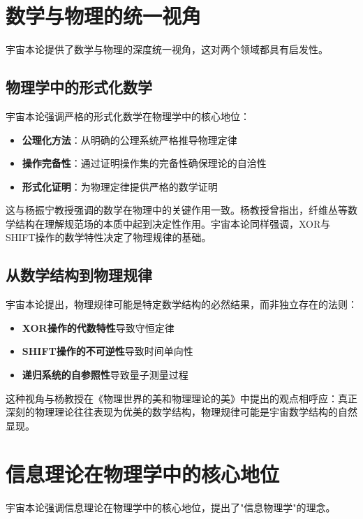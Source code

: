 \section{数学与物理的统一视角}

宇宙本论提供了数学与物理的深度统一视角，这对两个领域都具有启发性。

\subsection{物理学中的形式化数学}

宇宙本论强调严格的形式化数学在物理学中的核心地位：

\begin{itemize}
  \item \textbf{公理化方法}：从明确的公理系统严格推导物理定律
  \item \textbf{操作完备性}：通过证明操作集的完备性确保理论的自洽性
  \item \textbf{形式化证明}：为物理定律提供严格的数学证明
\end{itemize}

这与杨振宁教授强调的数学在物理中的关键作用一致。杨教授曾指出，纤维丛等数学结构在理解规范场的本质中起到决定性作用。宇宙本论同样强调，XOR与SHIFT操作的数学特性决定了物理规律的基础。

\subsection{从数学结构到物理规律}

宇宙本论提出，物理规律可能是特定数学结构的必然结果，而非独立存在的法则：

\begin{itemize}
  \item \textbf{XOR操作的代数特性}导致守恒定律
  \item \textbf{SHIFT操作的不可逆性}导致时间单向性
  \item \textbf{递归系统的自参照性}导致量子测量过程
\end{itemize}

这种视角与杨教授在《物理世界的美和物理理论的美》中提出的观点相呼应：真正深刻的物理理论往往表现为优美的数学结构，物理规律可能是宇宙数学结构的自然显现。

\section{信息理论在物理学中的核心地位}

宇宙本论强调信息理论在物理学中的核心地位，提出了"信息物理学"的理念。

